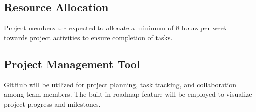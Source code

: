 \subsection*{Resource Allocation}

Project members are expected to allocate a minimum of 8 hours per week towards project activities to ensure completion of tasks.

\subsection*{Project Management Tool}

GitHub will be utilized for project planning, task tracking, and collaboration among team members. The built-in roadmap feature will be employed to visualize project progress and milestones.








  
